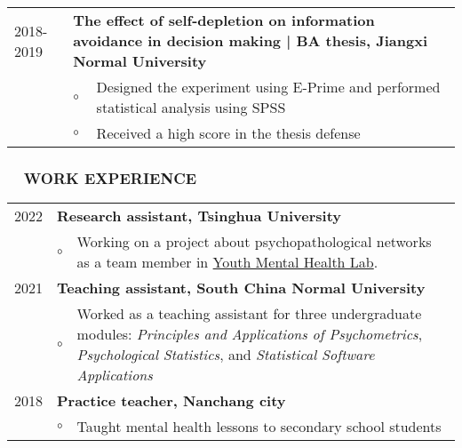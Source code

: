 \documentclass[a4paper, 12pt]{article}
\begin{document}
\begin{tabularx}{\textwidth}{p{2cm} p{0.1cm} X}
    2018-2019 & \multicolumn{2}{X}{\textbf{The effect of self-depletion on information avoidance in decision making | BA thesis, Jiangxi Normal University}} \\
    & $\circ$ & Designed the experiment using E-Prime and performed statistical analysis using SPSS \\
    & $\circ$ & Received a high score in the thesis defense \\

    \end{tabularx}

\subsubsection*{ \ \ WORK EXPERIENCE}

\begin{tabularx}{\textwidth}{p{2cm} p{0.1cm} X}

    2022 & \multicolumn{2}{X}{\textbf{Research assistant, Tsinghua University}} \\
    & $ \circ $ & Working on a project about psychopathological networks as a team member in \href{https://www.ymhlab.com}{Youth Mental Health Lab}. \\
    

    2021 & \multicolumn{2}{X}{\textbf{Teaching assistant, South China Normal University}} \\
    & $ \circ $ & Worked as a teaching assistant for three undergraduate modules: \textit{Principles and Applications of Psychometrics}, \textit{Psychological Statistics}, and \textit{Statistical Software Applications} \\

    2018 & \multicolumn{2}{X}{\textbf{Practice teacher, Nanchang city}} \\
    & $ \circ $ & Taught mental health lessons to secondary school students

    \end{tabularx}
\end{document}
